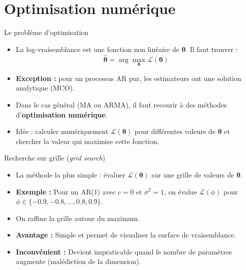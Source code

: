 \documentclass[11pt,aspectratio=169]{beamer}
\begin{document}
\section{Optimisation numérique}

\begin{frame}{Le problème d'optimisation}

\begin{itemize}

\item La log-vraisemblance est une fonction non linéaire de $\bm{\theta}$. Il faut trouver :
  \[
  \hat{\bm{\theta}} = \arg\max_{\bm{\theta}} \mathcal{L}(\bm{\theta})
  \]\newline

\item \textbf{Exception :} pour un processus AR pur, les estimateurs ont une solution analytique (MCO).\newline

\item Dans le cas général (MA ou ARMA), il faut recourir à des méthodes d'\textbf{optimisation numérique}.\newline

\item Idée : calculer numériquement $\mathcal{L}(\bm{\theta})$ pour différentes valeurs de $\bm{\theta}$ et chercher la valeur qui maximise cette fonction.

\end{itemize}

\end{frame}

\begin{frame}{Recherche sur grille (\emph{grid search})}

\begin{itemize}

\item La méthode la plus simple : évaluer $\mathcal{L}(\bm{\theta})$ sur une grille de valeurs de $\bm{\theta}$.\newline

\item \textbf{Exemple :} Pour un AR(1) avec $c = 0$ et $\sigma^2 = 1$, on évalue $\mathcal{L}(\phi)$ pour $\phi \in \{-0.9, -0.8, \ldots, 0.8, 0.9\}$.\newline

\item On raffine la grille autour du maximum.\newline

\item \textbf{Avantage :} Simple et permet de visualiser la surface de vraisemblance.\newline

\item \textbf{Inconvénient :} Devient impraticable quand le nombre de paramètres augmente (malédiction de la dimension).

\end{itemize}

\end{frame}
\end{document}
